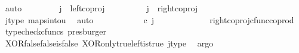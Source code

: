 \begin{isabellebody}
\ auto\isanewline
\ \ \isamarkupfalse%
\isanewline
\ \ \ \ \isamarkupfalse%
\ {\isachardoublequoteopen}j\ {\isasymnoteq}\ left{\isacharunderscore}{\kern0pt}coproj\ {\isasymone}\ {\isasymone}{\isachardoublequoteclose}\isanewline
\ \ \ \ \isamarkupfalse%
\ \isamarkupfalse%
\ {\isachardoublequoteopen}j\ {\isacharequal}{\kern0pt}\ right{\isacharunderscore}{\kern0pt}coproj\ {\isasymone}\ {\isasymone}{\isachardoublequoteclose}\isanewline
\ \ \ \ \ \ \isamarkupfalse%
\ j{\isacharunderscore}{\kern0pt}type\ maps{\isacharunderscore}{\kern0pt}into{\isacharunderscore}{\kern0pt}{}u{}\ \isamarkupfalse%
\ auto\isanewline
\ \ \ \ \isamarkupfalse%
\ \isamarkupfalse%
\ {\isachardoublequoteopen}{\isacharparenleft}{\kern0pt}{\isasymlangle}{\isasymt}{\isacharcomma}{\kern0pt}\ {\isasymt}{\isasymrangle}\ {\isasymamalg}{\isasymlangle}{\isasymf}{\isacharcomma}{\kern0pt}\ {\isasymf}{\isasymrangle}{\isacharparenright}{\kern0pt}\ {\isasymcirc}\isactrlsub c\ j\ \ {\isacharequal}{\kern0pt}\ {\isasymlangle}{\isasymf}{\isacharcomma}{\kern0pt}\ {\isasymf}{\isasymrangle}{\isachardoublequoteclose}\isanewline
\ \ \ \ \ \ \isamarkupfalse%
\ \ right{\isacharunderscore}{\kern0pt}coproj{\isacharunderscore}{\kern0pt}cfunc{\isacharunderscore}{\kern0pt}coprod\ \isamarkupfalse%
\ {\isacharparenleft}{\kern0pt}typecheck{\isacharunderscore}{\kern0pt}cfuncs{\isacharcomma}{\kern0pt}\ presburger{\isacharparenright}{\kern0pt}\isanewline
\ \ \ \ \isamarkupfalse%
\ \isamarkupfalse%
\ {\isachardoublequoteopen}{\isasymlangle}{\isasymf}{\isacharcomma}{\kern0pt}\ {\isasymt}{\isasymrangle}\ {\isacharequal}{\kern0pt}\ {\isasymlangle}{\isasymf}{\isacharcomma}{\kern0pt}\ {\isasymf}{\isasymrangle}{\isachardoublequoteclose}\isanewline
\ \ \ \ \ \ \isamarkupfalse%
\ XOR{\isacharunderscore}{\kern0pt}false{\isacharunderscore}{\kern0pt}false{\isacharunderscore}{\kern0pt}is{\isacharunderscore}{\kern0pt}false\ XOR{\isacharunderscore}{\kern0pt}only{\isacharunderscore}{\kern0pt}true{\isacharunderscore}{\kern0pt}left{\isacharunderscore}{\kern0pt}is{\isacharunderscore}{\kern0pt}true\ j{\isacharunderscore}{\kern0pt}type\ \isamarkupfalse%
\ argo\isanewline
\ \ \ \ \isamarkupfalse%
\ \isamarkupfalse%
\ {\isachardoublequoteopen}{\isasymt}\ {\isacharequal}{\kern0pt}\ {\isasymf}{\isachardoublequoteclose}\isanewline
\ \ \ \ \ \ \isamarkupfalse%

\end{isabellebody}
